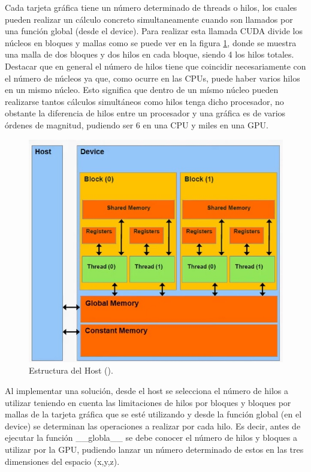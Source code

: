 \documentclass[11pt,a4paper,twoside,pdf]{article}
\numberwithin{equation}{section}
\begin{document}
Cada tarjeta gráfica tiene un número determinado de threads o hilos, los cuales pueden realizar un cálculo concreto simultaneamente cuando son llamados por una función global (desde el device). Para realizar esta llamada CUDA divide los núcleos en bloques y mallas como se puede ver en la figura \ref{fig:componentes gpu}, donde se muestra una malla de dos bloques y dos hilos en cada bloque, siendo 4 los hilos totales. Destacar que en general el número de hilos tiene que coincidir necesariamente con el número de núcleos ya que, como ocurre en las CPUs, puede haber varios hilos en un mismo núcleo. Esto significa que dentro de un mísmo núcleo pueden realizarse tantos cálculos simultáneos como hilos tenga dicho procesador, no obstante la diferencia de hilos entre un procesador y una gráfica es de varios órdenes de magnitud, pudiendo ser 6 en una CPU y miles en una GPU.

\begin{figure}[h]
\centering
\includegraphics[width=10 cm]{Nvidia-Device_Structure.jpg}				
\caption{Estructura del Host (\cite{web}). }
\label{fig:componentes gpu}
\end{figure}
\noindent

Al implementar una solución, desde el host se selecciona el número de hilos a utilizar teniendo en cuenta las limitaciones de hilos por bloques y bloques por mallas de la tarjeta gráfica que se esté utilizando y desde la función global (en el device) se determinan las operaciones a realizar por cada hilo. Es decir, antes de ejecutar la función \_\_globla\_\_ se debe conocer el número de hilos y bloques a utilizar por la GPU, pudiendo lanzar un número determinado de estos en las tres dimensiones del espacio (x,y,z).
\end{document}
